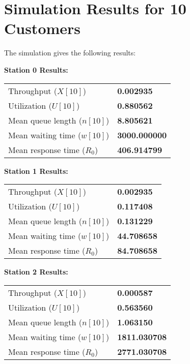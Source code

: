 \documentclass[12pt]{article}
\begin{document}
	\section*{Simulation Results for 10 Customers}
	The simulation gives the following results:
	
	\noindent\textbf{Station 0 Results:}
	\begin{table}[h!]
		\centering
		\begin{tabular}{@{}l l@{}}
			\toprule
			Throughput ($X[10]$)              & \textbf{0.002935} \\
			Utilization ($U[10]$)             & \textbf{0.880562} \\
			Mean queue length ($n[10]$)       & \textbf{8.805621} \\
			Mean waiting time ($w[10]$)       & \textbf{3000.000000} \\
			Mean response time ($R_0$)        & \textbf{406.914799} \\
			\bottomrule
		\end{tabular}
	\end{table}
	
	\noindent\textbf{Station 1 Results:}
	\begin{table}[h!]
		\centering
		\begin{tabular}{@{}l l@{}}
			\toprule
			Throughput ($X[10]$)              & \textbf{0.002935} \\
			Utilization ($U[10]$)             & \textbf{0.117408} \\
			Mean queue length ($n[10]$)       & \textbf{0.131229} \\
			Mean waiting time ($w[10]$)       & \textbf{44.708658} \\
			Mean response time ($R_0$)        & \textbf{84.708658} \\
			\bottomrule
		\end{tabular}
	\end{table}
	
	\noindent\textbf{Station 2 Results:}
	\begin{table}[h!]
		\centering
		\begin{tabular}{@{}l l@{}}
			\toprule
			Throughput ($X[10]$)              & \textbf{0.000587} \\
			Utilization ($U[10]$)             & \textbf{0.563560} \\
			Mean queue length ($n[10]$)       & \textbf{1.063150} \\
			Mean waiting time ($w[10]$)       & \textbf{1811.030708} \\
			Mean response time ($R_0$)        & \textbf{2771.030708} \\
			\bottomrule
		\end{tabular}
	\end{table}
	
\end{document}
